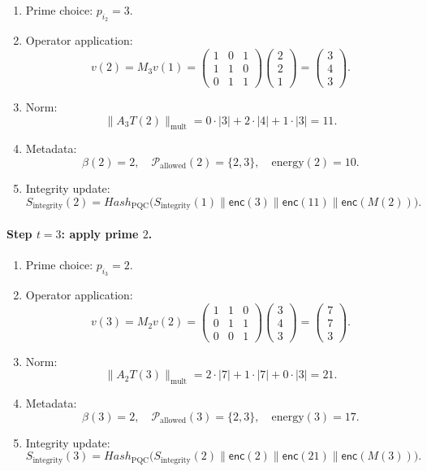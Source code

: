 \documentclass[11pt]{article}
\begin{document}
\begin{enumerate}[leftmargin=1.5em]
  \item Prime choice: \(p_{i_2} = 3\).
  \item Operator application:
  \[
    v(2) = M_3 v(1) =
    \begin{pmatrix}
    1 & 0 & 1 \\
    1 & 1 & 0 \\
    0 & 1 & 1
    \end{pmatrix}
    \begin{pmatrix}2\\2\\1\end{pmatrix}
    = \begin{pmatrix}3\\4\\3\end{pmatrix}.
  \]
  \item Norm:
  \[
    \|A_{3}T(2)\|_{\text{mult}} =
    0\cdot|3| + 2\cdot|4| + 1\cdot|3| = 11.
  \]
  \item Metadata:
  \[
    \beta(2) = 2, \quad
    \mathcal{P}_{\text{allowed}}(2) = \{2,3\}, \quad
    \text{energy}(2) = 10.
  \]
  \item Integrity update:
  \[
    S_{\text{integrity}}(2)
    = Hash_{\text{PQC}}\big(
      S_{\text{integrity}}(1) \parallel \mathsf{enc}(3)\parallel \mathsf{enc}(11)\parallel \mathsf{enc}(M(2))
    \big).
  \]
\end{enumerate}

\paragraph{Step \(t=3\): apply prime \(2\).}

\begin{enumerate}[leftmargin=1.5em]
  \item Prime choice: \(p_{i_3} = 2\).
  \item Operator application:
  \[
    v(3) = M_2 v(2) =
    \begin{pmatrix}
    1 & 1 & 0 \\
    0 & 1 & 1 \\
    0 & 0 & 1
    \end{pmatrix}
    \begin{pmatrix}3\\4\\3\end{pmatrix}
    = \begin{pmatrix}7\\7\\3\end{pmatrix}.
  \]
  \item Norm:
  \[
    \|A_{2}T(3)\|_{\text{mult}} =
    2\cdot|7| + 1\cdot|7| + 0\cdot|3| = 21.
  \]
  \item Metadata:
  \[
    \beta(3) = 2, \quad
    \mathcal{P}_{\text{allowed}}(3) = \{2,3\}, \quad
    \text{energy}(3) = 17.
  \]
  \item Integrity update:
  \[
    S_{\text{integrity}}(3)
    = Hash_{\text{PQC}}\big(
      S_{\text{integrity}}(2) \parallel \mathsf{enc}(2)\parallel \mathsf{enc}(21)\parallel \mathsf{enc}(M(3))
    \big).
  \]
\end{enumerate}
\end{document}
